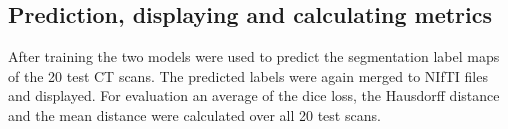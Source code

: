 \subsection{Prediction, displaying and calculating metrics}

After training the two models were used to predict the segmentation label maps of the 20 test CT scans. The predicted labels were again merged to NIfTI files and displayed. For evaluation an average of the dice loss, the Hausdorff distance and the mean distance were calculated over all 20 test scans.